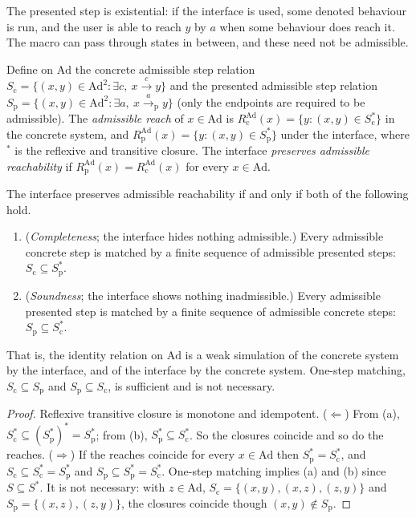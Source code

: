 The presented step is existential: if the interface is used, some denoted behaviour is run, and the user is able to reach $y$ by $a$ when some behaviour does reach it. The macro can pass through states in between, and these need not be admissible.

Define on $\mathrm{Ad}$ the concrete admissible step relation $S_{\mathrm c}=\{(x,y)\in\mathrm{Ad}^2:\exists c,\ x\xrightarrow{c}y\}$ and the presented admissible step relation $S_{\mathrm p}=\{(x,y)\in\mathrm{Ad}^2:\exists a,\ x\xrightarrow{a}_{\mathrm p}y\}$ (only the endpoints are required to be admissible). The \emph{admissible reach} of $x\in\mathrm{Ad}$ is $R^{\mathrm{Ad}}_{\mathrm c}(x)=\{y:(x,y)\in S_{\mathrm c}^{*}\}$ in the concrete system, and $R^{\mathrm{Ad}}_{\mathrm p}(x)=\{y:(x,y)\in S_{\mathrm p}^{*}\}$ under the interface, where $^{*}$ is the reflexive and transitive closure. The interface \emph{preserves admissible reachability} if $R^{\mathrm{Ad}}_{\mathrm p}(x)=R^{\mathrm{Ad}}_{\mathrm c}(x)$ for every $x\in\mathrm{Ad}$.

\begin{newresult}\label{thm:interface}
The interface preserves admissible reachability if and only if both of the following hold.
\begin{enumerate}[nosep,label=(\alph*)]
  \item (\emph{Completeness}; the interface hides nothing admissible.) Every admissible concrete step is matched by a finite sequence of admissible presented steps: $S_{\mathrm c}\subseteq S_{\mathrm p}^{*}$.
  \item (\emph{Soundness}; the interface shows nothing inadmissible.) Every admissible presented step is matched by a finite sequence of admissible concrete steps: $S_{\mathrm p}\subseteq S_{\mathrm c}^{*}$.
\end{enumerate}
That is, the identity relation on $\mathrm{Ad}$ is a weak simulation of the concrete system by the interface, and of the interface by the concrete system. One-step matching, $S_{\mathrm c}\subseteq S_{\mathrm p}$ and $S_{\mathrm p}\subseteq S_{\mathrm c}$, is sufficient and is not necessary.
\end{newresult}
\begin{proof}
Reflexive transitive closure is monotone and idempotent. ($\Leftarrow$) From (a), $S_{\mathrm c}^{*}\subseteq(S_{\mathrm p}^{*})^{*}=S_{\mathrm p}^{*}$; from (b), $S_{\mathrm p}^{*}\subseteq S_{\mathrm c}^{*}$. So the closures coincide and so do the reaches. ($\Rightarrow$) If the reaches coincide for every $x\in\mathrm{Ad}$ then $S_{\mathrm p}^{*}=S_{\mathrm c}^{*}$, and $S_{\mathrm c}\subseteq S_{\mathrm c}^{*}=S_{\mathrm p}^{*}$ and $S_{\mathrm p}\subseteq S_{\mathrm p}^{*}=S_{\mathrm c}^{*}$. One-step matching implies (a) and (b) since $S\subseteq S^{*}$. It is not necessary: with $z\in\mathrm{Ad}$, $S_{\mathrm c}=\{(x,y),(x,z),(z,y)\}$ and $S_{\mathrm p}=\{(x,z),(z,y)\}$, the closures coincide though $(x,y)\notin S_{\mathrm p}$.
\end{proof}

